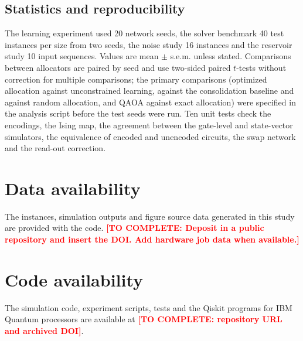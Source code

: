 \documentclass[12pt,a4paper]{article}
\newcommand{\todo}[1]{\textcolor{red}{\textbf{[TO COMPLETE: #1]}}}
\begin{document}
\subsection*{Statistics and reproducibility}
The learning experiment used 20 network seeds, the solver benchmark 40 test instances per size from two seeds, the noise study 16 instances and the reservoir study 10 input sequences. Values are mean $\pm$ s.e.m. unless stated. Comparisons between allocators are paired by seed and use two-sided paired $t$-tests without correction for multiple comparisons; the primary comparisons (optimized allocation against unconstrained learning, against the consolidation baseline and against random allocation, and QAOA against exact allocation) were specified in the analysis script before the test seeds were run. Ten unit tests check the encodings, the Ising map, the agreement between the gate-level and state-vector simulators, the equivalence of encoded and unencoded circuits, the swap network and the read-out correction.

\section*{Data availability}
The instances, simulation outputs and figure source data generated in this study are provided with the code. \todo{Deposit in a public repository and insert the DOI. Add hardware job data when available.}

\section*{Code availability}
The simulation code, experiment scripts, tests and the Qiskit programs for IBM Quantum processors are available at \todo{repository URL and archived DOI}.
\end{document}
